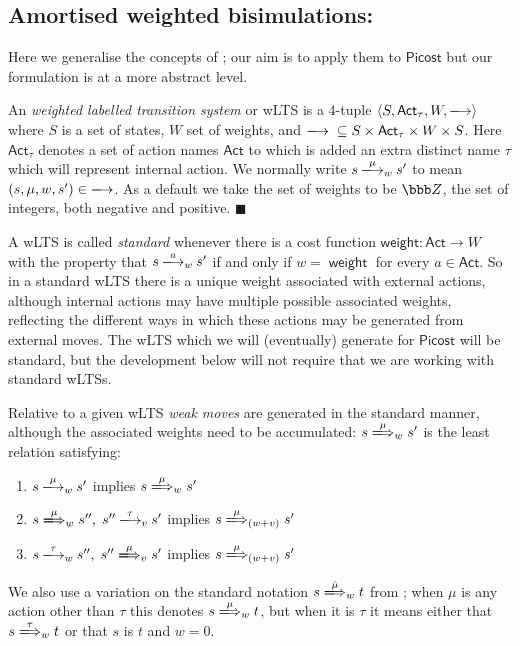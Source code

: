 \documentclass{LMCS}
\newcommand{\pfn}[1]{\mathsf{#1}}  \newcommand{\cfn}[1]{\mathsf{#1}}  \newcommand{\ownfnt}[1]{{\mathsf{#1}}}
\newcommand{\picost}{\ensuremath{\pfn{Picost}}\xspace}
\newcommand{\Act}{\ensuremath{\mathsf{Act}}\xspace}
\newcommand{\cost}[1]{\mathop{\mathsf{weight}(#1)}}
\newcommand{\costN}{\mathsf{weight}}
\newcommand{\ar}[1]{\mathbin{\xlongrightarrow{ #1}}}
\newcommand{\dar}[1]{\xLongrightarrow{\vspace{-2em}#1}}
\newcommand{\EndDefBox}{\null\hfill$\blacksquare$}
\newcommand{\boxHere}{\global\let\EndProof\empty\EndDefBox}
\begin{document}
\subsection{Amortised weighted bisimulations:}

Here we generalise  the concepts of \cite{astrid}; our aim is to apply them 
to \picost but our formulation is at a more abstract level.
\begin{defi}
An \emph{weighted labelled transition system} or wLTS is a 4-tuple 
$\langle S, \Act_\tau, W,\ar{} \rangle$ where $S$ is a set of states,
$W$ set of weights, and 
$\ar{} \;\subseteq S \times \Act_{\tau} \times W \times S$.
Here $\Act_\tau$ denotes a set of action names  $\Act$ to which is added an
extra distinct name $\tau$ which will represent internal action. 
We normally write $s \ar{\mu}_w s'$ to mean 
$(s,\mu,w,s') \in \ar{}$. As a default we take the set of weights
to be $\bbb Z$, the set of integers, both negative and positive. \boxHere
\end{defi}
A wLTS is called \emph{standard} whenever there is a cost function
$\costN: \Act \rightarrow W$ with the property that $s \ar{a}_w s'$ if
and only if $w= \cost{a}$ for every $a \in \Act$.  So in a standard
wLTS there is a unique weight associated with external actions,
although internal actions may have multiple possible associated
weights, reflecting the different ways in which these actions may be
generated from external moves. The wLTS which we will (eventually)
generate for \picost will be standard, but the development below will
not require that we are working with standard wLTSs.

Relative to a given wLTS \emph{weak moves} are generated in the
standard manner, although the associated weights need to be
accumulated: $s \dar{\mu}_w s'$ is the least relation satisfying:
\begin{enumerate}[$\bullet$]
\item $s \ar{\mu}_w s'$ implies  $s \dar{\mu}_w s'$

\item  $s \dar{\mu}_w s'',\; s'' \ar{\tau}_v s'$ implies $s \dar{\mu}_{(w+v)} s'$

\item  $s \ar{\tau}_w s'',\; s'' \dar{\mu}_v s'$ implies $s \dar{\mu}_{(w+v)} s'$
\end{enumerate}
We also use a variation on the standard notation $s \dar{\hat{\mu}}_w t$ from  \cite{ccs};
when $\mu$ is any action other than $\tau$ this denotes  $s \dar{\mu}_w t$, but when it is 
$\tau$ it means either that $s \dar{\tau}_w t$ or that $s$ is $t$ and $w = 0$.
\end{document}
